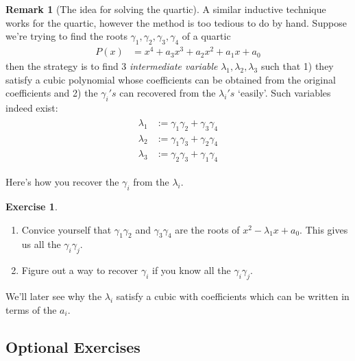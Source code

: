 \documentclass[reqno, 12pt, letter]{article}
\theoremstyle{plain}
\theoremstyle{definition}
\newtheorem{remark}[theorem]{Remark}
\newtheorem{exercise}[theorem]{Exercise}
\theoremstyle{remark}
\numberwithin{equation}{section}
\begin{document}
	\begin{remark}[The idea for solving the quartic]
		\label{remark:}
		A similar inductive technique works for the quartic, however the method is too tedious to do by hand. Suppose we're trying to find the roots $ \gamma_1, \gamma_2, \gamma_3, \gamma_4$ of a quartic \begin{align*}
			P(x) &= x^4 + a_3x^3 + a_2x^2 + a_1x + a_0
		\end{align*}
		then the strategy is to find 3 \emph{intermediate variable} $ \lambda_1, \lambda_2, \lambda_3$ such that 1) they satisfy a cubic polynomial whose coefficients can be obtained from the original coefficients and 2) the $\gamma_i's$ can recovered from the $ \lambda_i's$ `easily'. Such variables indeed exist:
			\begin{align}
				\label{equation:intermediate_variables_quartic}
				\begin{split}
					\lambda_1 &:= \gamma_1 \gamma_2 + \gamma_3 \gamma_4 \\
					\lambda_2 &:= \gamma_1 \gamma_3 + \gamma_2 \gamma_4 \\
					\lambda_3 &:= \gamma_2 \gamma_3 + \gamma_1 \gamma_4 
				\end{split}
			\end{align}
		
		Here's how you recover the $ \gamma_i$ from the $ \lambda_i$.
		\begin{exercise}
			\begin{enumerate}
				\item Convice yourself that $ \gamma_1 \gamma_2$ and $\gamma_3 \gamma_4$ are the roots of $ x^2 - \lambda_1 x + a_0$. This gives us all the $ \gamma_i \gamma_j$.
				\item Figure out a way to recover $ \gamma_i$ if you know all the $ \gamma_i \gamma_j$.
			\end{enumerate}
		\end{exercise}
		We'll later see why the $ \lambda_i$ satisfy a cubic with coefficients which can be written in terms of the $ a_i$.
	\end{remark}
	\subsection{Optional Exercises}
	
\end{document}
